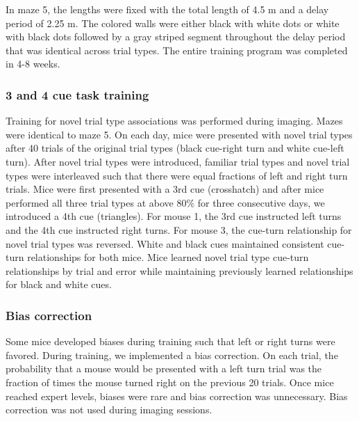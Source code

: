 \bigskip

In maze 5, the lengths were fixed with the total length of 4.5 m and a delay period of 2.25 m. The colored walls were either black with white dots or white with black dots followed by a gray striped segment throughout the delay period that was identical across trial types. The entire training program was completed in 4-8 weeks.

\bigskip

\subsubsection{3 and 4 cue task training}
Training for novel trial type associations was performed during imaging. Mazes were identical to maze 5. On each day, mice were presented with novel trial types after 40 trials of the original trial types (black cue-right turn and white cue-left turn). After novel trial types were introduced, familiar trial types and novel trial types were interleaved such that there were equal fractions of left and right turn trials. Mice were first presented with a 3rd cue (crosshatch) and after mice performed all three trial types at above 80$\%$ for three consecutive days, we introduced a 4th cue (triangles). For mouse 1, the 3rd cue instructed left turns and the 4th cue instructed right turns. For mouse 3, the cue-turn relationship for novel trial types was reversed. White and black cues maintained consistent cue-turn relationships for both mice. Mice learned novel trial type cue-turn relationships by trial and error while maintaining previously learned relationships for black and white cues. 

\bigskip

\subsubsection{Bias correction}
Some mice developed biases during training such that left or right turns were favored. During training, we implemented a bias correction. On each trial, the probability that a mouse would be presented with a left turn trial was the fraction of times the mouse turned right on the previous 20 trials. Once mice reached expert levels, biases were rare and bias correction was unnecessary. Bias correction was not used during imaging sessions.

